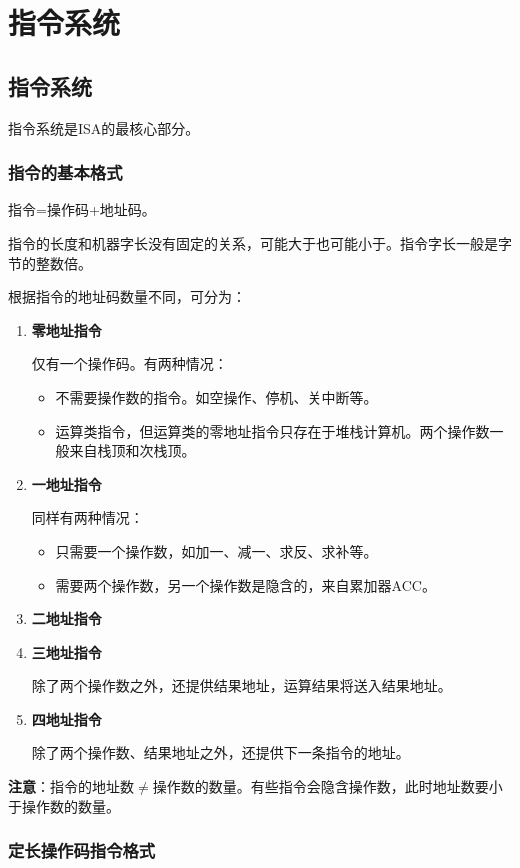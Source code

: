 \documentclass[12pt, a4paper, oneside]{ctexart}
\begin{document}
\section{指令系统}

\subsection{指令系统}

指令系统是ISA的最核心部分。

\subsubsection{指令的基本格式}

指令=操作码+地址码。

指令的长度和机器字长没有固定的关系，可能大于也可能小于。指令字长一般是字节的整数倍。

根据指令的地址码数量不同，可分为：
\begin{enumerate}
  \item {\bf 零地址指令}
  
  仅有一个操作码。有两种情况：
  \begin{itemize}
    \item 不需要操作数的指令。如空操作、停机、关中断等。
    \item 运算类指令，但运算类的零地址指令只存在于堆栈计算机。两个操作数一般来自栈顶和次栈顶。
  \end{itemize}
  \item {\bf 一地址指令}
  
  同样有两种情况：
  \begin{itemize}
    \item 只需要一个操作数，如加一、减一、求反、求补等。
    \item 需要两个操作数，另一个操作数是隐含的，来自累加器ACC。
  \end{itemize}
  \item {\bf 二地址指令}
  \item {\bf 三地址指令}
  
  除了两个操作数之外，还提供结果地址，运算结果将送入结果地址。
  \item {\bf 四地址指令}
  
  除了两个操作数、结果地址之外，还提供下一条指令的地址。
\end{enumerate}

\textbf{注意}：指令的地址数$\neq$操作数的数量。有些指令会隐含操作数，此时地址数要小于操作数的数量。

\subsubsection{定长操作码指令格式}
\end{document}
